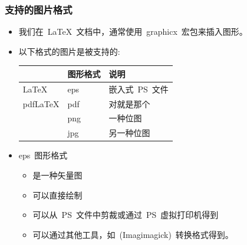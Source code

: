 \begin{frame}
	\frametitle{支持的图片格式}
	\begin{itemize}
		\item 我们在~\LaTeX~文档中，通常使用~\alert{graphicx}~宏包来插入图形。
		\item 以下格式的图片是被支持的:
			\begin{tabular}[t]{lll}
				\hline
				\mbox{~}	& 图形格式 & 说明\\
				\hline
				\LaTeX		& eps	& 嵌入式~PS~文件 \\
				pdf\LaTeX	& pdf	& 对就是那个 \\
				\mbox{~}	& png	& 一种位图 \\
				\mbox{~}	& jpg	& 另一种位图 \\
				\hline
			\end{tabular}
		\item<2-> eps~图形格式
			\begin{itemize}
				\item 是一种矢量图
				\item 可以直接绘制
				\item 可以从~PS~文件中剪裁或通过~PS~虚拟打印机得到
				\item 可以通过其他工具，如~(Imagimagick)~转换格式得到。
			\end{itemize}
	\end{itemize}
\end{frame}

